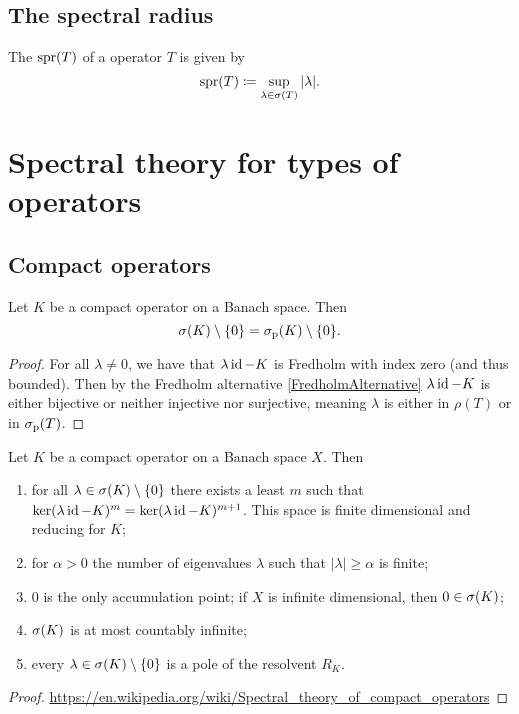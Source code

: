 \subsection{The spectral radius}
\begin{definition}
The  $\operatorname{spr}(T)$ of a operator $T$ is given by
\[ \operatorname{spr}(T) \coloneqq \sup_{\lambda\in\sigma(T)}|\lambda|. \]
\end{definition}


\section{Spectral theory for types of operators}
\subsection{Compact operators}

\begin{proposition} \label{pointSpectrumCompactOperatorBanachSpace}
Let $K$ be a compact operator on a Banach space. Then
\[ \sigma(K)\setminus\{0\} = \sigma_\text{p}(K)\setminus\{0\}. \]
\end{proposition}
\begin{proof}
For all $\lambda\neq 0$, we have that $\lambda\operatorname{id} - K$ is Fredholm with index zero (and thus bounded). Then by the Fredholm alternative \ref{FredholmAlternative} $\lambda\operatorname{id} - K$ is either bijective or neither injective nor surjective, meaning $\lambda$ is either in $\rho(T)$ or in $\sigma_\text{p}(T)$.
\end{proof}

\begin{proposition} \label{spectrumCompactOperator}
Let $K$ be a compact operator on a Banach space $X$. Then
\begin{enumerate}
\item for all $\lambda\in\sigma(K)\setminus\{0\}$ there exists a least $m$ such that $\ker(\lambda\operatorname{id}- K)^m = \ker(\lambda\operatorname{id}- K)^{m+1}$. This space is finite dimensional and reducing for $K$;
\item for $\alpha > 0$ the number of eigenvalues $\lambda$ such that $|\lambda|\geq \alpha$ is finite;
\item $0$ is the only accumulation point; if $X$ is infinite dimensional, then $0\in\sigma(K)$;
\item $\sigma(K)$ is at most countably infinite;
\item every $\lambda \in \sigma(K)\setminus \{0\}$ is a pole of the resolvent $R_K$.
\end{enumerate}
\end{proposition}
\begin{proof}
\url{https://en.wikipedia.org/wiki/Spectral_theory_of_compact_operators}
\end{proof}

